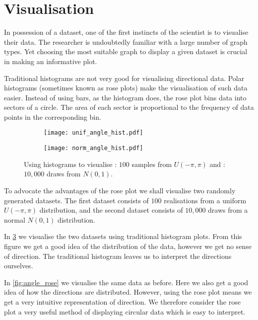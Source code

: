 \section{Visualisation}
\label{sec:circular_visualisation}

In possession of a dataset, one of the first instincts of the scientist is to visualise their data. The researcher is undoubtedly familiar with a large number of graph types. Yet choosing the most suitable graph to display a given dataset is crucial in making an informative plot.

Traditional histograms are not very good for visualising directional data. Polar histograms (sometimes known as rose plots) make the visualisation of such data easier. Instead of using bars, as the histogram does, the rose plot bins data into sectors of a circle. The area of each sector is proportional to the frequency of data points in the corresponding bin.

\begin{figure}[!htbp]
	\centering
	\begin{subfigure}[b]{0.49\textwidth}
		\centering
		\texttt{[image: unif\_angle\_hist.pdf]}
		\caption{}
		\label{subfig:unif_angle_hist}
	\end{subfigure}
	\begin{subfigure}[b]{0.49\textwidth}
		\centering
		\texttt{[image: norm\_angle\_hist.pdf]}
		\caption{}
		\label{subfig:norm_angle_hist}
	\end{subfigure}
	\caption{Using histograms to visualise : $100$ samples from $U(-\pi, \pi)$ and : $10,000$ draws from $N(0, 1)$.}
	\label{fig:angle_hist}
\end{figure}

To advocate the advantages of the rose plot we shall visualise two randomly generated datasets. The first dataset consists of $100$ realisations from a uniform $U(-\pi,\pi)$ distribution, and the second dataset consists of $10,000$ draws from a normal $N(0, 1)$ distribution.

In \cref{fig:angle_hist} we visualise the two datasets using traditional histogram plots. From this figure we get a good idea of the distribution of the data, however we get no sense of direction. The traditional histogram leaves us to interpret the directions ourselves.

In \cref{fig:angle_rose} we visualise the same data as before. Here we also get a good idea of how the directions are distributed. However, using the rose plot means we get a very intuitive representation of direction. We therefore consider the rose plot a very useful method of displaying circular data which is easy to interpret.

